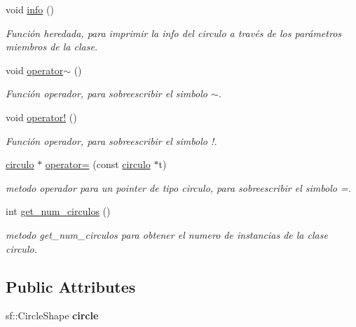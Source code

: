 \begin{DoxyCompactItemize}
\mbox{\label{classcirculo_a855a548d7426a8272171889d661032ab}} 
void \hyperlink{classcirculo_a855a548d7426a8272171889d661032ab}{info} ()
\begin{DoxyCompactList}\small\item\em Función heredada, para imprimir la info del circulo a través de los parámetros miembros de la clase. \end{DoxyCompactList}\item 
\mbox{\label{classcirculo_a2a70c0e9468e8450871b9704aeb516cf}} 
void \hyperlink{classcirculo_a2a70c0e9468e8450871b9704aeb516cf}{operator$\sim$} ()
\begin{DoxyCompactList}\small\item\em Función operador, para sobreescribir el simbolo $\sim$. \end{DoxyCompactList}\item 
\mbox{\label{classcirculo_a46e8b7ec1f88b0f9392382b9b99428fb}} 
void \hyperlink{classcirculo_a46e8b7ec1f88b0f9392382b9b99428fb}{operator!} ()
\begin{DoxyCompactList}\small\item\em Función operador, para sobreescribir el simbolo !. \end{DoxyCompactList}\item 
\hyperlink{classcirculo}{circulo} $\ast$ \hyperlink{classcirculo_a4dc6891872873a86791f3777c74d8aad}{operator=} (const \hyperlink{classcirculo}{circulo} $\ast$t)
\begin{DoxyCompactList}\small\item\em metodo operador para un pointer de tipo circulo, para sobreescribir el simbolo =. \end{DoxyCompactList}\item 
\mbox{\label{classcirculo_a4a943b20d7e86555fb5da55b5177f87e}} 
int \hyperlink{classcirculo_a4a943b20d7e86555fb5da55b5177f87e}{get\+\_\+num\+\_\+circulos} ()
\begin{DoxyCompactList}\small\item\em metodo get\+\_\+num\+\_\+circulos para obtener el numero de instancias de la clase circulo. \end{DoxyCompactList}\end{DoxyCompactItemize}
\subsection*{Public Attributes}
\begin{DoxyCompactItemize}
\item 
\mbox{\label{classcirculo_a892b0a66e25aa6686fbfd4e1c2a5d43a}} 
sf\+::\+Circle\+Shape {\bfseries circle}
\end{DoxyCompactItemize}
